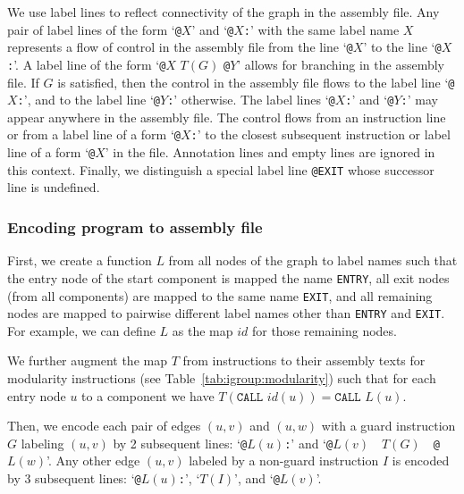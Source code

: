 \documentclass[10pt,twocolumn]{article}
\begin{document}
We use label lines to reflect connectivity of the graph in the assembly file.
Any pair of label lines of the form `\texttt{@}$ X $' and `\texttt{@}$ X
$\texttt{:}' with the same label name $ X $ represents a flow of control in the
assembly file from the line `\texttt{@}$ X $' to the line `\texttt{@}$ X
$\texttt{:}'. A label line of the form `\texttt{@}$ X $ $ T(G) $ \texttt{@}$ Y
$' allows for branching in the assembly file. If $ G $ is satisfied, then the
control in the assembly file flows to the label line `\texttt{@}$ X
$\texttt{:}', and to the label line `\texttt{@}$ Y $\texttt{:}' otherwise. The
label lines `\texttt{@}$ X $\texttt{:}' and `\texttt{@}$ Y $\texttt{:}' may
appear anywhere in the assembly file. The control flows from an instruction line
or from a label line of a form `\texttt{@}$ X $\texttt{:}' to the closest
subsequent instruction or label line of a form `\texttt{@}$ X $' in the file.
Annotation lines and empty lines are ignored in this context. Finally, we
distinguish a special label line \texttt{@EXIT} whose successor line is
undefined.

\subsubsection{Encoding program to assembly file}
\label{sec:microcode:assembly:encoding}

First, we create a function $ L $ from all nodes of the graph to label names
such that the entry node of the start component is mapped the name
\texttt{ENTRY}, all exit nodes (from all components) are mapped to the same name
\texttt{EXIT}, and all remaining nodes are mapped to pairwise different label
names other than \texttt{ENTRY} and \texttt{EXIT}. For example, we can define $
L $ as the map $ \mathit{id} $ for those remaining nodes.

We further augment the map $ T $ from instructions to their assembly texts for
modularity instructions (see Table~\ref{tab:igroup:modularity}) such that for
each entry node $ u $ to a component we have $ T(\texttt{CALL } \mathit{id}(u))
= \texttt{CALL } L(u)$.

 Then, we encode each
pair of edges $ (u,v) $ and $ (u,w) $ with a guard instruction $ G $ labeling $
(u,v) $ by 2 subsequent lines: `\texttt{@}$ L(u) $\texttt{:}' and `\texttt{@}$
L(v) $~~$ T(G) $~~\texttt{@}$ L(w) $'. Any other edge $ (u,v) $ labeled by a
non-guard instruction $ I $ is encoded by 3 subsequent lines: `\texttt{@}$ L(u)
$\texttt{:}', `$ T(I) $', and `\texttt{@}$ L(v) $'.
\end{document}
